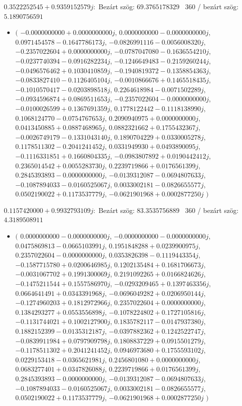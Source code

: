 \documentclass[14pt,a4paper]{article}
\begin{document}
$0.3522252545+0.9359152579j$:\
Bezárt szög: $69.3765178329$ \
360 / bezárt szög: $5.1890756591$\
\begin{itemize}
\item
$\big($
$-0.0000000000+0.0000000000j$, $0.0000000000-0.0000000000j$, $0.0971454578-0.1647786173j$, $-0.0826991116-0.0056008320j$, $-0.2357022604+0.0000000000j$, $-0.0787047080-0.1636554210j$, $-0.0237740394-0.0916282234j$, $-0.1246649483-0.2159260244j$, $-0.0496576462+0.1030410859j$, $-0.1940819372-0.1358854363j$, $-0.0833827410-0.1126405104j$, $-0.0010866676+0.1465518435j$, $-0.1010570417-0.0203898518j$, $0.2264618984-0.0071502289j$, $-0.0934596874+0.0869511653j$, $-0.2357022604-0.0000000000j$, $-0.0100026599+0.1367691359j$, $0.1778122442-0.1118138990j$, $0.1068124770-0.0754767653j$, $0.2090940975+0.0000000000j$, $0.0413450885+0.0887468965j$, $0.0882321662+0.1755432367j$, $-0.0026749179-0.1331043140j$, $0.1890704229+0.0330005278j$, $0.1178511302-0.2041241452j$, $0.0331949930+0.0493890095j$, $-0.1116331851+0.1660804335j$, $-0.0983807892+0.0190442412j$, $0.2365014542+0.0055283730j$, $0.2239719866+0.0176561399j$, $0.2845393893-0.0000000000j$, $-0.0139312087-0.0694807633j$, $-0.1087894033-0.0160525067j$, $0.0033002181-0.0826655577j$, $0.0502190022+0.1173537779j$, $-0.0621901968+0.0002877250j$
$\big)$
\end{itemize}
$0.1157420000+0.9932793109j$:\
Bezárt szög: $83.3535756889$ \
360 / bezárt szög: $4.3189508911$\
\begin{itemize}
\item
$\big($
$0.0000000000-0.0000000000j$, $-0.0000000000-0.0000000000j$, $0.0475869813-0.0665103991j$, $0.1951848288+0.0239900975j$, $0.2357022604-0.0000000000j$, $0.0353826398-0.1119443354j$, $-0.1587715780+0.0200646985j$, $0.1202135484+0.1681706673j$, $-0.0031067702+0.1991300069j$, $0.2191092265+0.0166824626j$, $-0.1475211544+0.1557586970j$, $-0.0293209465+0.1397463356j$, $0.0664641491+0.0343391968j$, $-0.0696049282+0.0206950144j$, $-0.1274960203+0.1812972966j$, $0.2357022604+0.0000000000j$, $0.1384293277+0.0553556898j$, $-0.1078224802+0.1727105816j$, $-0.1131744021+0.1002127900j$, $0.1835782117-0.0147937380j$, $0.1882152399-0.0135312187j$, $-0.0397882362+0.1242522747j$, $-0.0839911984+0.0797909798j$, $0.1808837229+0.0915501279j$, $-0.1178511302+0.2041241452j$, $0.0946973680+0.1755593102j$, $0.0229153418-0.0365621981j$, $0.2456801080+0.0000000000j$, $0.0683277401+0.0347826088j$, $0.2239719866+0.0176561399j$, $0.2845393893-0.0000000000j$, $-0.0139312087-0.0694807633j$, $-0.1087894033-0.0160525067j$, $0.0033002181-0.0826655577j$, $0.0502190022+0.1173537779j$, $-0.0621901968+0.0002877250j$
$\big)$
\end{itemize}
\end{document}
